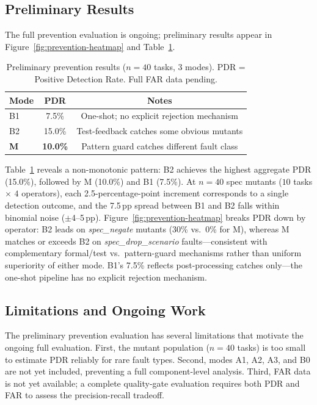 \subsection{Preliminary Results}

The full prevention evaluation is ongoing; preliminary results appear in
Figure~\ref{fig:prevention-heatmap} and Table~\ref{tab:prevention}.

\begin{table}[t]
  \caption{Preliminary prevention results ($n=40$ tasks, 3 modes). PDR = Positive
    Detection Rate. Full FAR data pending.}
  \label{tab:prevention}
  \centering
  \begin{tabular}{lcc}
    \toprule
    Mode & PDR & Notes \\
    \midrule
    B1 & 7.5\%  & One-shot; no explicit rejection mechanism \\
    B2 & 15.0\% & Test-feedback catches some obvious mutants \\
    \textbf{M}  & \textbf{10.0\%} & Pattern guard catches different fault class \\
    \bottomrule
  \end{tabular}
\end{table}

Table~\ref{tab:prevention} reveals a non-monotonic pattern: B2 achieves the highest
aggregate PDR (15.0\%), followed by M (10.0\%) and B1 (7.5\%).
At $n=40$ spec mutants ($10$ tasks $\times$ $4$ operators), each
2.5-percentage-point increment corresponds to a single detection outcome, and
the 7.5\,pp spread between B1 and B2 falls within binomial noise
($\pm$4--5\,pp).
Figure~\ref{fig:prevention-heatmap} breaks PDR down by operator: B2 leads on
\textit{spec\_negate} mutants (30\% vs.\ 0\% for M), whereas M matches or
exceeds B2 on \textit{spec\_drop\_scenario} faults---consistent with
complementary formal/test vs.\ pattern-guard mechanisms rather than uniform
superiority of either mode.
B1's 7.5\% reflects post-processing catches
only---the one-shot pipeline has no explicit rejection mechanism.

\subsection{Limitations and Ongoing Work}

The preliminary prevention evaluation has several limitations that motivate the
ongoing full evaluation.  First, the mutant population ($n=40$ tasks) is too small
to estimate PDR reliably for rare fault types.  Second, modes A1, A2, A3, and B0
are not yet included, preventing a full component-level analysis.  Third, FAR data
is not yet available; a complete quality-gate evaluation requires both PDR and FAR
to assess the precision-recall tradeoff.

